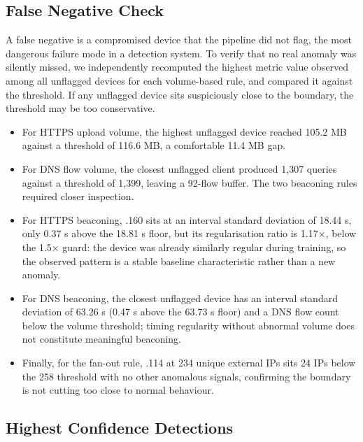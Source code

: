 \documentclass[
  11pt,
]{article}
\begin{document}
\hypertarget{false-negative-check}{%
\subsection{False Negative Check}\label{false-negative-check}}

A false negative is a compromised device that the pipeline did not flag,
the most dangerous failure mode in a detection system. To verify that no
real anomaly was silently missed, we independently recomputed the
highest metric value observed among all unflagged devices for each
volume-based rule, and compared it against the threshold. If any
unflagged device sits suspiciously close to the boundary, the threshold
may be too conservative.

\begin{itemize}
    \item For HTTPS upload volume, the highest unflagged device reached 105.2 MB against a threshold of 116.6 MB, a comfortable 11.4 MB gap.
    \item For DNS flow volume, the closest unflagged client produced 1,307 queries against a threshold of 1,399, leaving a 92-flow buffer. The two beaconing rules required closer inspection.
    \item  For HTTPS beaconing, .160 sits at an interval standard deviation of 18.44 s, only 0.37 s above the 18.81 s floor, but its regularisation ratio is 1.17×, below the 1.5× guard: the device was already similarly regular during training, so the observed pattern is a stable baseline characteristic rather than a new anomaly.
    \item  For DNS beaconing, the closest unflagged device has an interval standard deviation of 63.26 s (0.47 s above the 63.73 s floor) and a DNS flow count below the volume threshold; timing regularity without abnormal volume does not constitute meaningful beaconing.
    \item  Finally, for the fan-out rule, .114 at 234 unique external IPs sits 24 IPs below the 258 threshold with no other anomalous signals, confirming the boundary is not cutting too close to normal behaviour.
\end{itemize}

\newpage
\hypertarget{highest-confidence-detections}{%
\subsection{Highest Confidence
Detections}\label{highest-confidence-detections}}
\end{document}
